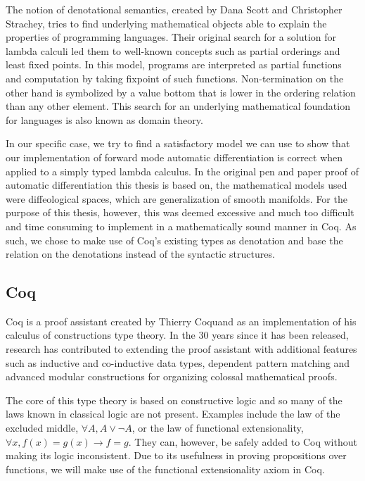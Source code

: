 \documentclass[a4, 12pt, final]{article}
\begin{document}
The notion of denotational semantics, created by Dana Scott and Christopher Strachey\cite{Scott1977}, tries to find underlying mathematical objects able to explain the properties of programming languages.
Their original search for a solution for lambda calculi led them to well-known concepts such as partial orderings and least fixed points.
In this model, programs are interpreted as partial functions and computation by taking fixpoint of such functions.
Non-termination on the other hand is symbolized by a value bottom that is lower in the ordering relation than any other element.
This search for an underlying mathematical foundation for languages is also known as domain theory.

In our specific case, we try to find a satisfactory model we can use to show that our implementation of forward mode automatic differentiation is correct when applied to a simply typed lambda calculus.
In the original pen and paper proof of automatic differentiation this thesis is based on, the mathematical models used were diffeological spaces, which are generalization of smooth manifolds.
For the purpose of this thesis, however, this was deemed excessive and much too difficult and time consuming to implement in a mathematically sound manner in Coq.
As such, we chose to make use of Coq's existing types as denotation and base the relation on the denotations instead of the syntactic structures.


\subsection{Coq}

Coq is a proof assistant created by Thierry Coquand as an implementation of his calculus of constructions type theory\cite{Coquand1988}.
In the 30 years since it has been released, research has contributed to extending the proof assistant with additional features such as inductive and co-inductive data types\cite{Coquand1990}, dependent pattern matching\cite{Sozeau2010} and advanced modular constructions for organizing colossal mathematical proofs\cite{Sozeau2008}\cite{Mahboubi2013}.

The core of this type theory is based on constructive logic and so many of the laws known in classical logic are not present.
Examples include the law of the excluded middle, $\forall A, A \vee \neg A$, or the law of functional extensionality, $\forall x, f(x) = g(x) \rightarrow f = g$.
They can, however, be safely added to Coq without making its logic inconsistent.
Due to its usefulness in proving propositions over functions, we will make use of the functional extensionality axiom in Coq.
\end{document}
